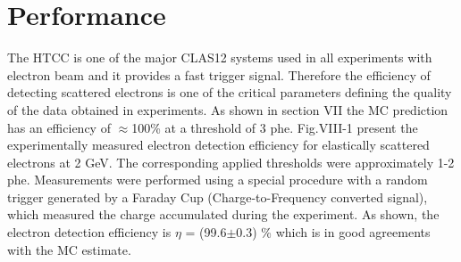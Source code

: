 \section{Performance}The HTCC is one of the major CLAS12 systems used in all experiments with electron beam and it provides a fast trigger signal. Therefore the efficiency of detecting scattered electrons is one of the critical parameters defining the quality of the data obtained in experiments. As shown in section VII the MC prediction has an efficiency of $\approx$100\% at a threshold of 3 phe. Fig.VIII-1 present the experimentally measured electron detection efficiency for elastically scattered electrons at 2 GeV. The corresponding applied thresholds were approximately 1-2 phe. Measurements were performed using a special procedure with a random trigger generated by a Faraday Cup (Charge-to-Frequency converted signal), which measured the charge accumulated during the experiment. As shown, the electron detection efficiency is $\eta$ = (99.6$\pm$0.3) \% which is in good agreements with the MC estimate.

